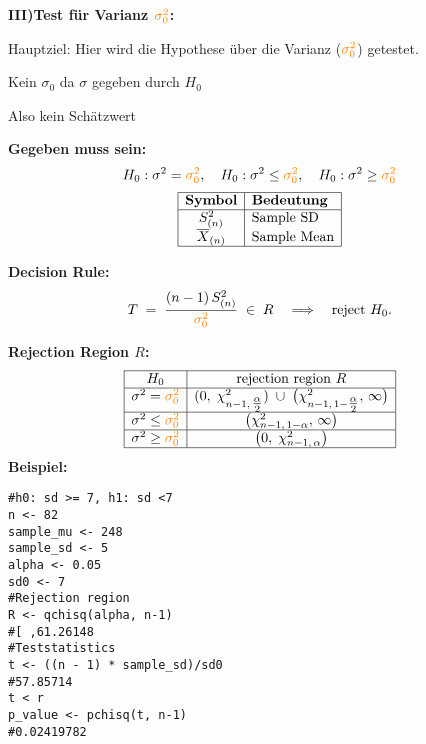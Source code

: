 \begin{multicols*}{2}
\begin{center}
    \large{\textbf{III)Test für Varianz $\textcolor{orange}{\sigma_0^2}$:}}
\end{center}
\normalsize

Hauptziel: Hier wird die Hypothese über die Varianz ($\textcolor{orange}{\sigma_0^2}$) getestet.
\begin{center}

\textcolor{red}{\warning} Kein $\sigma_0$ da $\sigma$ gegeben durch $H_0$\textcolor{red}{\warning}

\textcolor{red}{\warning} Also kein Schätzwert \textcolor{red}{\warning}
\end{center}
\large{\textbf{Gegeben muss sein:}}
\[
H_0: \sigma^2 = \textcolor{orange}{\sigma_0^2}, \quad H_0: \sigma^2 \leq \textcolor{orange}{\sigma_0^2}, \quad H_0: \sigma^2 \geq \textcolor{orange}{\sigma_0^2}
\]
\[
\begin{array}{|c|l|}
\hline
\textbf{Symbol} & \textbf{Bedeutung} \\
\hline
S_{(n)}^2& \text{Sample SD} \\
\overline{X}_{(n)} & \text{Sample Mean} \\
\hline
\end{array}
\]
\begin{comment}
\large{\textbf{Teststatistic:}}
\[
T \;=\; \frac{(n-1)\,S_{(n)}^2}{\textcolor{orange}{\sigma^2}}
\;\;\sim\;\;\chi^2_{n-1}
\quad\text{with}\quad
S_{(n)}^2
\;=\;
\frac{1}{n-1}\sum_{i=1}^n
\bigl(X_i - \overline{X}_{(n)}\bigr)^2.
\]
\end{comment}

\large{\textbf{Decision Rule:}}
\[
T
\;=\;
\frac{(n-1)\,S_{(n)}^2}{\textcolor{orange}{\sigma_0^2}}
\;\in\; R
\quad\Longrightarrow\quad
\text{reject }H_0.
\]

\large{\textbf{Rejection Region \(R\):}}
\[
\begin{array}{|c|c|}
\hline
H_0 & \text{rejection region } R \\
\hline
\sigma^2 = \textcolor{orange}{\sigma_0^2}
&
(0,\;\chi^2_{n-1,\,\tfrac{\alpha}{2}})
\;\cup\;
\bigl(\chi^2_{n-1,\,1-\tfrac{\alpha}{2}},\,\infty\bigr)
\\ \hline
\sigma^2 \leq \textcolor{orange}{\sigma_0^2}
&
\bigl(\chi^2_{n-1,\,1-\alpha},\,\infty\bigr)
\\ \hline
\sigma^2 \geq \textcolor{orange}{\sigma_0^2}
&
\bigl(0,\;\chi^2_{n-1,\,\alpha}\bigr)
\\ \hline
\end{array}
\]
\large{\textbf{Beispiel:}}
\begin{lstlisting}
#h0: sd >= 7, h1: sd <7
n <- 82
sample_mu <- 248
sample_sd <- 5
alpha <- 0.05
sd0 <- 7
#Rejection region 
R <- qchisq(alpha, n-1)
#[ ,61.26148
#Teststatistics
t <- ((n - 1) * sample_sd)/sd0
#57.85714
t < r
p_value <- pchisq(t, n-1)
#0.02419782
\end{lstlisting}
\columnbreak



\end{multicols*}
